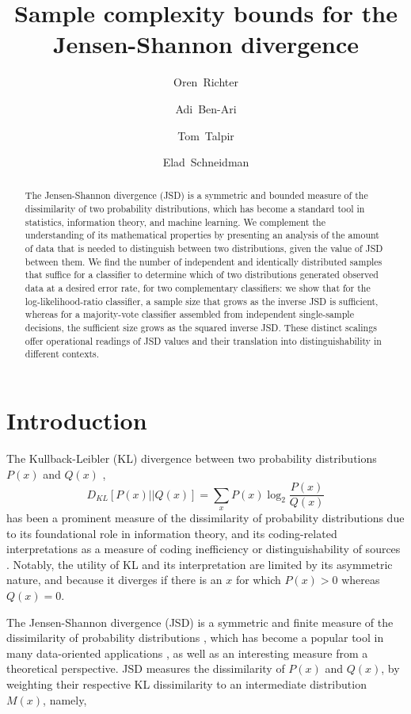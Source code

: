 \documentclass{article}
\date{}
\title{Sample complexity bounds for the Jensen-Shannon divergence}
\author[1]{\mbox{Oren Richter}}
\author[1]{\mbox{Adi Ben-Ari}}
\author[1]{\mbox{Tom Talpir}}
\author[1,\Letter]{\mbox{Elad Schneidman}}
\affil[1]{Department of Brain Sciences, Weizmann Institute of Science, Rehovot 76100, Israel}
\affil[\Letter]{elad.schneidman@weizmann.ac.il}
\begin{document}
\maketitle

\begin{abstract}
The Jensen-Shannon divergence (JSD) is a symmetric and bounded measure of the dissimilarity of two probability distributions, which has become a standard tool in statistics, information theory, and machine learning. We complement the understanding of its mathematical properties by presenting an analysis of the amount of data that is needed to distinguish between two distributions, given the value of JSD between them. We find the number of independent and identically distributed samples that suffice for a classifier to determine which of two distributions generated observed data at a desired error rate, for two complementary classifiers: we show that for the log-likelihood-ratio classifier, a sample size that grows as the inverse JSD is sufficient, whereas for a majority-vote classifier assembled from independent single-sample decisions, the sufficient size grows as the squared inverse JSD. These distinct scalings offer operational readings of JSD values and their translation into distinguishability in different contexts. 
\end{abstract}
 
\section*{Introduction}
The Kullback-Leibler (KL) divergence between two probability distributions $P(x)$ and $Q(x)$ , 
\begin{equation} 
D_{KL}[P(x)||Q(x)] = \sum_x P(x) \log_2 \frac{P(x)}{Q(x)} 
\end{equation} 
has been a prominent measure of the dissimilarity of probability distributions \cite{kl_divergence_1951} due to its foundational role in information theory, and its coding-related interpretations as a measure of coding inefficiency or distinguishability of sources \cite{cover_elements_2005}. Notably, the utility of KL and its interpretation are limited by its asymmetric nature, and because it diverges if there is an $x$ for which $P(x)>0$ whereas $Q(x)=0$. 

The Jensen-Shannon divergence (JSD) is a symmetric and finite measure of the dissimilarity of probability distributions \cite{lin_divergence_1991}, which has become a popular tool in many data-oriented applications \cite{grosse_analysis,sims_alignment-free,goodfellow_generative_2014}, as well as an interesting measure from a theoretical perspective. JSD measures the dissimilarity of $P(x)$ and $Q(x)$, by weighting their respective KL dissimilarity to an intermediate distribution $M(x)$, namely, 
\end{document}

